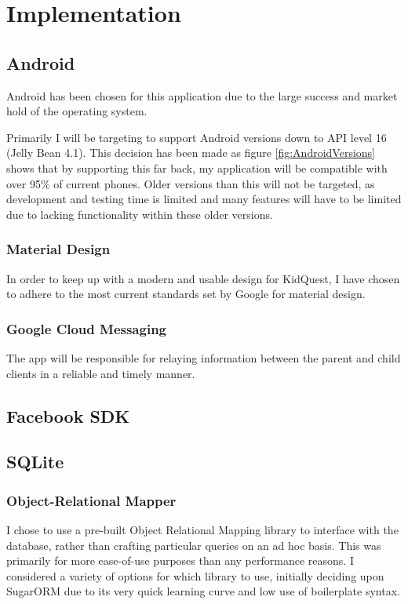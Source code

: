 

\chapter{Implementation}


\section{Android}
Android has been chosen for this application due to the large success and market hold of the operating system.

Primarily I will be targeting to support Android versions down to API level 16 (Jelly Bean 4.1).
This decision has been made as figure \ref{fig:AndroidVersions} shows that by supporting this far back, my application will be compatible with over 95\% of current phones. 
Older versions than this will not be targeted, as development and testing time is limited and many features will have to be limited due to lacking functionality within these older versions.

\subsection{Material Design}
In order to keep up with a modern and usable design for KidQuest, I have chosen to adhere to the most current standards set by Google for material design.

\subsection{Google Cloud Messaging}
The app will be responsible for relaying information between the parent and child clients in a reliable and timely manner.


\section{Facebook SDK}

\section{SQLite}

\subsection{Object-Relational Mapper}
I chose to use a pre-built Object Relational Mapping library to interface with the database, rather than crafting particular queries on an ad hoc basis.
This was primarily for more ease-of-use purposes than any performance reasons. 
I considered a variety of options for which library to use, initially deciding upon SugarORM due to its very quick learning curve and low use of boilerplate syntax. 

